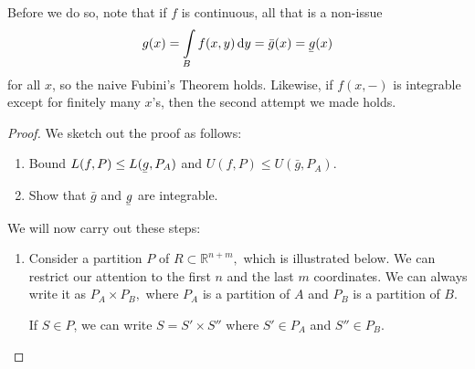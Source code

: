 \documentclass{article}
\newcommand{\ubar}[1]{\underaccent{\bar}{#1}}
\numberwithin{equation}{section}
\begin{document}
Before we do so, note that if $f$ is continuous, all that is a non-issue
\begin{equation}
    g(x) = \int\limits_B f(x,y) \dd{y} = \bar{g}(x)=\ubar{g}(x)
\end{equation}
for all $x$, so the naive Fubini's Theorem holds. Likewise, if $f(x,-)$ is integrable except for finitely many $x$'s, then the second attempt we made holds.
\begin{proof}
    We sketch out the proof as follows:
    \begin{enumerate}
        \item Bound $L(f,P) \le L(\ubar{g},P_A)$ and $U(f,P) \le U(\bar{g}, P_A)$.
        \item Show that $\bar{g}$ and $\ubar{g}$ are integrable.
    \end{enumerate}
    We will now carry out these steps:
    \begin{enumerate}
        \item Consider a partition $P$ of $R \subset \mathbb{R}^{n+m},$ which is illustrated below. We can restrict our attention to the first $n$ and the last $m$ coordinates. We can always write it as $P_A \times P_B,$ where $P_A$ is a partition of $A$ and $P_B$ is a partition of $B$.
              \begin{center}
              \end{center}
              If $S\in P$, we can write $S = S'\times S''$ where $S' \in P_A$ and $S'' \in P_B$.


\end{enumerate}
\end{proof}
\end{document}
